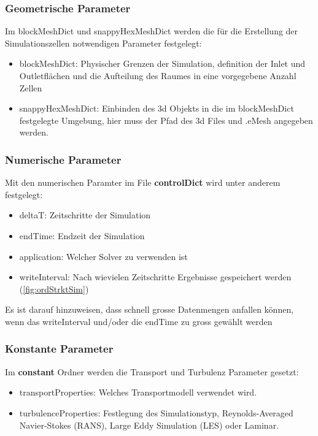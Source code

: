 \subsubsection{Geometrische Parameter\label{openfoam:section:Geometrische Parameter}}
Im blockMeshDict und snappyHexMeshDict werden die für die Erstellung der Simulationszellen notwendigen Parameter festgelegt:
\begin{itemize}
    \item blockMeshDict: Physischer Grenzen der Simulation, definition der Inlet und Outletflächen und die Aufteilung des Raumes in eine vorgegebene Anzahl Zellen
    \item snappyHexMeshDict: Einbinden des 3d Objekts in die im blockMeshDict festgelegte Umgebung, hier muss der Pfad des 3d Files und .eMesh angegeben werden.
\end{itemize}

\subsubsection{Numerische Parameter\label{openfoam:section:Numerische Parameter}}
Mit den numerischen Paramter im File \textbf{controlDict} wird unter anderem festgelegt:
\begin{itemize}
    \item deltaT: Zeitschritte der Simulation
    \item endTime: Endzeit der Simulation
    \item application: Welcher Solver zu verwenden ist
    \item writeInterval: Nach wievielen Zeitschritte Ergebnisse gespeichert werden (\ref{fig:ordStrktSim})
\end{itemize}
Es ist darauf hinzuweisen, dass schnell grosse Datenmengen anfallen können, wenn das writeInterval und/oder die endTime zu gross gewählt werden

\subsubsection{Konstante Parameter\label{openfoam:section:Konstante Parameter}}
Im \textbf{constant} Ordner werden die Transport und Turbulenz Parameter gesetzt:
\begin{itemize}
    \item transportProperties: Welches Transportmodell verwendet wird.
    \item turbulenceProperties: Festlegung des Simulationstyp, Reynolds-Averaged Navier-Stokes (RANS), Large Eddy Simulation (LES) oder Laminar.
\end{itemize}

